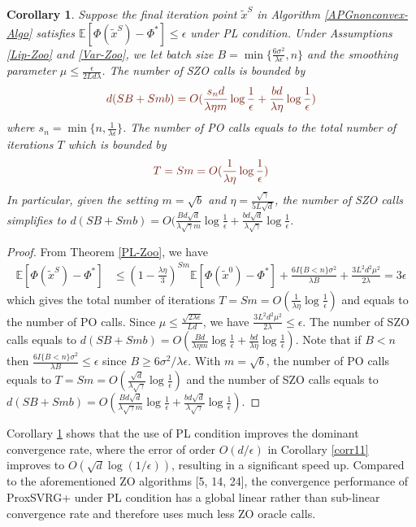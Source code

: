 \documentclass{article}
\newcommand*{\E}{\mathbb{E}}
\newtheorem{corollary}[theorem]{Corollary}
\theoremstyle{definition}
\theoremstyle{remark}
\begin{document}
\begin{corollary}\label{PL-Zo-Cor}
Suppose the final iteration point $\tilde{x}^S$ in Algorithm \ref{APGnonconvex-Algo} satisfies $\E[\Phi(\tilde{x}^S) - \Phi^*]\leq \epsilon$ under PL condition. Under Assumptions \ref{Lip-Zoo} and \ref{Var-Zoo}, we let batch size $B = \min\{\frac{6\sigma^2}{\lambda\epsilon},n\}$ and the smoothing parameter $\mu\leq \frac{\epsilon}{2Ld\lambda}$. The number of SZO calls is bounded by
\[
{\color{Brown}d(SB+Smb) = O(\frac{s_n d}{\lambda\eta m}\log\frac{1}{\epsilon}+\frac{b d}{\lambda\eta}\log\frac{1}{\epsilon})}
\]
where $s_n = \min \{n,\frac{1}{\lambda \epsilon}\}$.
The number of PO calls equals to the total number of iterations $T$ which is bounded by
\[
{\color{Brown} T = Sm = O(\frac{1}{\lambda\eta}\log\frac{1}{\epsilon})}
\]
In particular, given the setting  $m=\sqrt{b}$ and {\color{blue}$\eta = \frac{\sqrt{\gamma}}{5 L \sqrt{d}}$}, the number of SZO calls  simplifies to 
{\color{blue}$d(SB+Smb) = O(\frac{Bd\sqrt{d}}{\lambda\sqrt{\gamma} m}\log\frac{1}{\epsilon}+\frac{bd\sqrt{d}}{\lambda\sqrt{\gamma}}\log\frac{1}{\epsilon}$.}
\end{corollary}
\begin{proof}
From Theorem \ref{PL-Zoo}, we have
\begin{align}
\E[\Phi(\widetilde{x}^S) - {\Phi}^*] & \leq   \left(1-\frac{\lambda\eta}{3}\right)^{Sm} \E[\Phi(\widetilde{x}^0) - {\Phi}^*] + \frac{6I\{B < n\} \sigma ^2}{\lambda B}+\frac{3 L^2 d^2 \mu^2}{2\lambda}= 3 \epsilon
\end{align}
which gives the total number of iterations {\color{Brown} $T = Sm = O(\frac{1}{\lambda\eta}\log\frac{1}{\epsilon})$} and equals to the number of PO calls. Since $\mu \leq \frac{\sqrt{2\lambda\epsilon}}{L d}$, we have $\frac{3 L^2 d^2 \mu^2}{2\lambda} \leq \epsilon$. The number of SZO calls equals to {\color{Brown}$d(SB+Smb) = O(\frac{Bd}{\lambda\eta m}\log\frac{1}{\epsilon}+\frac{bd}{\lambda\eta}\log\frac{1}{\epsilon})$}.  Note that if $B < n$ then $\frac{6I\{B < n\} \sigma ^2}{\lambda B} \leq \epsilon$ since $B \geq 6 {\sigma ^2}/{\lambda \epsilon}$. With $m=\sqrt{b}$, the number of PO calls equals to {\color{Blue} $T = Sm = O(\frac{\sqrt{d}}{\lambda\sqrt{\gamma}}\log\frac{1}{\epsilon})$} and the number of SZO calls equals to {\color{blue}$d(SB+Smb) = O(\frac{Bd\sqrt{d}}{\lambda\sqrt{\gamma} m}\log\frac{1}{\epsilon}+\frac{bd\sqrt{d}}{\lambda\sqrt{\gamma}}\log\frac{1}{\epsilon})$}.
\end{proof}
Corollary \ref{PL-Zo-Cor} shows that the use of PL condition improves the dominant convergence rate, where the error of
order $O(d/\epsilon)$ in Corollary \ref{corr11} improves to $O(\sqrt{d}\log(1/\epsilon))$, resulting in a significant speed up.
{\color{Brown}
 Compared to the aforementioned ZO algorithms [5, 14, 24], the convergence performance of ProxSVRG+ under PL condition has a global linear rather than sub-linear convergence rate and therefore  uses much less ZO oracle calls. 
}
\end{document}
